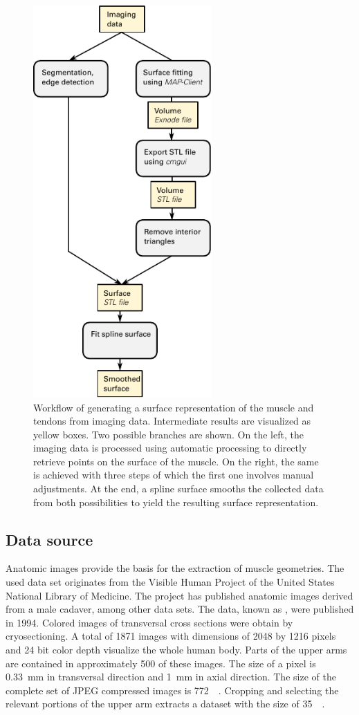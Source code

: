 \begin{figure}%
  \centering%
  \includegraphics[height=15cm]{images/fiber_creation/scheme_preprocessing.pdf}%
  \caption{Workflow of generating a surface representation of the muscle and tendons from imaging data. Intermediate results are visualized as yellow boxes. Two possible branches are shown. On the left, the imaging data is processed using automatic processing to directly retrieve points on the surface of the muscle. On the right, the same is achieved with three steps of which the first one involves manual adjustments. At the end, a spline surface smooths the collected data from both possibilities to yield the resulting surface representation.}%
  \label{fig:scheme_preprocessing}%
\end{figure}%

\subsection{Data source}
Anatomic images provide the basis for the extraction of muscle geometries.
The used data set originates from the Visible Human Project \cite{visible_human_male} of 
the United States National Library of Medicine. 
The project has published anatomic images derived from a male cadaver, among other data sets.
The data, known as , were published in 1994.
Colored images of transversal cross sections were obtain by cryosectioning.
A total of \num{1871} images with dimensions of \num{2048} by \num{1216} pixels and 24 bit color depth visualize the whole human body. Parts of the upper arms are contained in approximately 500 of these images. The size of a pixel is \SI{0.33}{\milli\meter} in transversal direction and \SI{1}{\milli\meter} in axial direction. The size of the complete set of JPEG compressed images is \SI{772}{\mega\byte}. Cropping and selecting the relevant portions of the upper arm extracts a dataset with the size of \SI{35}{\mega\byte}.

